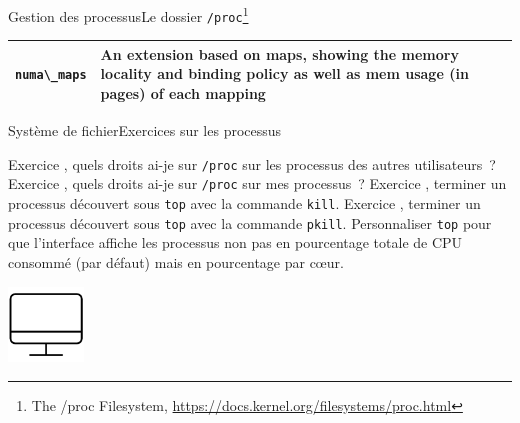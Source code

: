 \documentclass{beamer}
\begin{document}
\begin{frame}{Gestion des processus}{Le dossier \lstinline{/proc}\footnote{The /proc Filesystem, \url{https://docs.kernel.org/filesystems/proc.html}}}
\begin{footnotesize}
\begin{tiny}
\begin{table}[h!]
\begin{tabular}{|p{2cm}|p{8cm}|}
                        \hline
                        \lstinline{numa\_maps}    & An extension based on maps, showing the memory locality and binding policy as well as mem usage (in pages) of each mapping      \\
                        \hline
                    \end{tabular}
                \end{table}
            \end{tiny}
        \end{footnotesize}
    \end{frame}

    \begin{frame}{Système de fichier}{Exercices sur les processus}
        \begin{small}
            Exercice \execcounterdispinc{}, quels droits ai-je sur \lstinline{/proc} sur les processus des autres utilisateurs~?
            \bigbreak
            Exercice \execcounterdispinc{}, quels droits ai-je sur \lstinline{/proc} sur mes processus~?
            \bigbreak
            Exercice \execcounterdispinc{}, terminer un processus découvert sous \lstinline{top} avec la commande \lstinline{kill}.
            \bigbreak
            Exercice \execcounterdispinc{}, terminer un processus découvert sous \lstinline{top} avec la commande \lstinline{pkill}.
            \bigbreak
            Personnaliser \lstinline{top} pour que l'interface affiche les processus non pas en pourcentage totale de CPU consommé (par défaut) mais en pourcentage par cœur.
        \end{small}
        \begin{center}
            \includegraphics[width=2cm]{image/desktop}
        \end{center}
    \end{frame}
\end{document}
